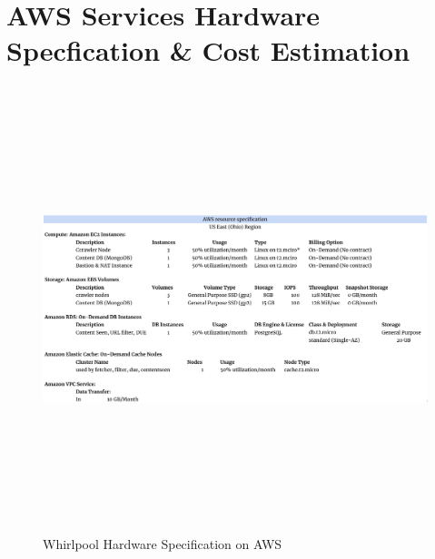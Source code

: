\section{AWS Services Hardware Specfication \& Cost Estimation}

\begin{figure}[h!]
  \centering
  \includegraphics[width=16cm,height=13cm,keepaspectratio]{../media/crawler/aws-resource.png}
  \caption{Whirlpool Hardware Specification on AWS}
  \label{fig:awsspec}
\end{figure}

